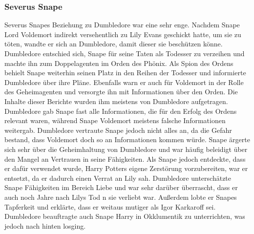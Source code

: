 \documentclass[a4paper, 10pt]{article}
\begin{document}
\subsubsection*{\large Severus Snape}
Severus Snapes Beziehung zu Dumbledore war eine sehr enge. Nachdem Snape Lord Voldemort indirekt versehentlich zu Lily Evans geschickt hatte, um sie zu töten, wandte er sich an Dumbledore, damit dieser sie beschützen könne. Dumbledore entschied sich, Snape für seine Taten als Todesser zu verzeihen und machte ihn zum Doppelagenten im Orden des Phönix.
\vspace{10pt}
\newline
Als Spion des Ordens behielt Snape weiterhin seinen Platz in den Reihen der Todesser und informierte Dumbledore über ihre Pläne. Ebenfalls warn er auch für Voldemort in der Rolle des Geheimagenten und versorgte ihn mit Informationen über den Orden. Die Inhalte dieser Berichte wurden ihm meistens von Dumbledore aufgetragen. Dumbledore gab Snape fast alle Informationen, die für den Erfolg des Ordens relevant waren, während Snape Voldemort meistens falsche Informationen weitergab.
\vspace{10pt}
\newline
Dumbledore vertraute Snape jedoch nicht alles an, da die Gefahr bestand, dass Voldemort doch so an Informationen kommen würde. Snape ärgerte sich sehr über die Geheimhaltung von Dumbledore und war häufig beleidigt über den Mangel an Vertrauen in seine Fähigkeiten. Als Snape jedoch entdeckte, dass er dafür verwendet wurde, Harry Potters eigene Zerstörung vorzubereiten, war er entsetzt, da er dadurch einen Verrat an Lily sah.
\vspace{10pt}
\newline
Dumbledore unterschätzte Snape Fähigkeiten im Bereich Liebe und war sehr darüber überrascht, dass er auch noch Jahre nach Lilys Tod n sie verliebt war. Außerdem lobte er Snapes Tapferkeit und erklärte, dass er weitaus mutiger als Igor Karkaroff sei. Dumbledore beauftragte auch Snape Harry in Okklumentik zu unterrichten, was jedoch nach hinten losging.
\vspace{10pt}
\newline
\end{document}
